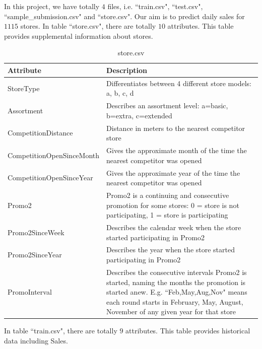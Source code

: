 \documentclass[11pt]{article}
\begin{document}
In this project, we have totally $4$ files, i.e. ``train.csv", ``test.csv", ``sample\_submission.csv" and ``store.csv". Our aim is to predict daily sales for $1115$ stores. In table ``store.csv", there are totally $10$ attributes. This table provides supplemental information about stores. 
\begin{table}[ht!]
	\begin{center}
		\begin{tabular}{|l|p{8cm}|}
			\hline
			Attribute & Description \\
			\hline
			StoreType & Differentiates between 4 different store models: a, b, c, d \\
			\hline
			Assortment & Describes an assortment level: a=basic, b=extra, c=extended \\
			\hline
			CompetitionDistance & Distance in meters to the nearest competitor store\\
			\hline
			CompetitionOpenSinceMonth & Gives the approximate month of the time the nearest competitor was opened\\
			\hline
			CompetitionOpenSinceYear & Gives the approximate year of the time the nearest competitor was opened\\
			\hline
			Promo2 & Promo2 is a continuing and consecutive promotion for some stores: 0 = store is not participating, 1 = store is participating\\
			\hline
			Promo2SinceWeek & Describes the calendar week when the store started participating in Promo2\\
			\hline
			Promo2SinceYear & Describes the year when the store started participating in Promo2\\
			\hline
			PromoInterval & Describes the consecutive intervals Promo2 is started, naming the months the promotion is started anew. E.g. ``Feb,May,Aug,Nov" means each round starts in February, May, August, November of any given year for that store\\
			\hline
		\end{tabular}
	\end{center}
	\caption{store.csv}
	\label{table1}
\end{table}%

In table ``train.csv", there are totally $9$ attributes. This table provides historical data including Sales. 
\end{document}
